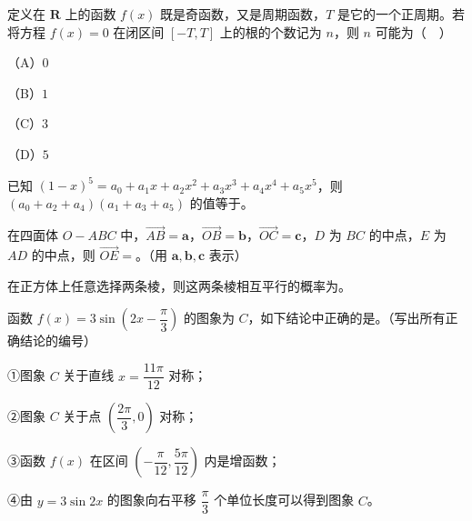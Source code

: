 \begin{question}
定义在 $\mathbf R$ 上的函数 $f(x)$ 既是奇函数，又是周期函数，$T$ 是它的一个正周期。若将方程 $f(x)=0$ 在闭区间 $[-T,T]$ 上的根的个数记为 $n$，则 $n$ 可能为（　）

（A）$0$

（B）$1$

（C）$3$

（D）$5$

\end{question}

\begin{question}
已知 $(1-x)^5=a_0+a_1x+a_2x^2+a_3x^3+a_4x^4+a_5x^5$，则 $(a_0+a_2+a_4)(a_1+a_3+a_5)$ 的值等于\gkblank{}。

\end{question}
\begin{question}
在四面体 $O-ABC$ 中，$\overrightarrow{AB}=\boldsymbol a$，$\overrightarrow{OB}=\boldsymbol b$，$\overrightarrow{OC}=\boldsymbol c$，$D$ 为 $BC$ 的中点，$E$ 为 $AD$ 的中点，则 $\overrightarrow{OE}=$\gkblank{}。（用 $\boldsymbol a,\boldsymbol b,\boldsymbol c$ 表示）

\end{question}
\begin{question}
在正方体上任意选择两条棱，则这两条棱相互平行的概率为\gkblank{}。

\end{question}
\begin{question}
函数 $f(x)=3\sin\left(2x-\dfrac{\pi}{3}\right)$ 的图象为 $C$，如下结论中正确的是\gkblank{}。（写出所有正确结论的编号）

①图象 $C$ 关于直线 $x=\dfrac{11\pi}{12}$ 对称；

②图象 $C$ 关于点 $\left(\dfrac{2\pi}{3},0\right)$ 对称；

③函数 $f(x)$ 在区间 $\left(-\dfrac{\pi}{12},\dfrac{5\pi}{12}\right)$ 内是增函数；

④由 $y=3\sin2x$ 的图象向右平移 $\dfrac{\pi}{3}$ 个单位长度可以得到图象 $C$。

\end{question}

